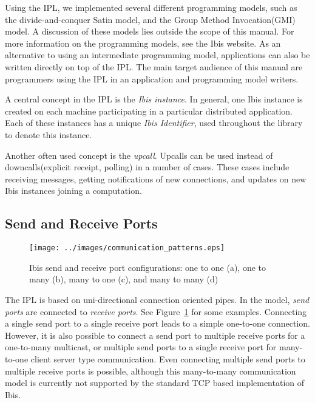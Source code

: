\documentclass[10pt]{article}
\begin{document}
Using the IPL, we implemented several different programming models, such
as the divide-and-conquer Satin model, and the Group Method
Invocation(GMI) model. A discussion of these models lies outside the
scope of this manual. For more information on the programming models,
see the Ibis website. As an alternative to using an intermediate
programming model, applications can also be written directly on top of
the IPL. The main target audience of this manual are programmers using
the IPL in an application and programming model writers.

A central concept in the IPL is the \emph{Ibis instance}. In general,
one Ibis instance is created on each machine participating in a
particular distributed application. Each of these instances has a unique
\emph{Ibis Identifier}, used throughout the library to denote this
instance.

Another often used concept is the \emph{upcall}. Upcalls can be used
instead of downcalls(explicit receipt, polling) in a number of cases.
These cases include receiving messages, getting notifications of new
connections, and updates on new Ibis instances joining a computation.

\subsection{Send and Receive Ports}


\begin{figure} \centering
\texttt{[image: ../images/communication\_patterns.eps]}
\caption{\label{ports}Ibis send and receive port configurations: one to one (a), one to many (b), many to one (c), and many to many (d)}
\end{figure}

The IPL is based on uni-directional connection oriented pipes. In the
model, \emph{send ports} are connected to \emph{receive ports}. See
Figure~\ref{ports} for some examples. Connecting a single send port to a
single receive port leads to a simple one-to-one connection. However, it is
also possible to connect a send port to multiple receive ports for a
one-to-many multicast, or multiple send ports to a single receive port
for many-to-one client server type communication. Even connecting
multiple send ports to multiple receive ports is possible, although this
many-to-many communication model is currently not supported by the
standard TCP based implementation of Ibis.
\end{document}
